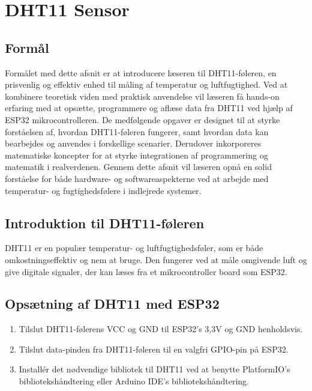 \section{DHT11 Sensor}
\subsection*{Formål}
Formålet med dette afsnit er at introducere læseren til DHT11-føleren, en prisvenlig og effektiv enhed til måling af temperatur og luftfugtighed. Ved at kombinere teoretisk viden med praktisk anvendelse vil læseren få hands-on erfaring med at opsætte, programmere og aflæse data fra DHT11 ved hjælp af ESP32 mikrocontrolleren. De medfølgende opgaver er designet til at styrke forståelsen af, hvordan DHT11-føleren fungerer, samt hvordan data kan bearbejdes og anvendes i forskellige scenarier. Derudover inkorporeres matematiske koncepter for at styrke integrationen af programmering og matematik i realverdenen. Gennem dette afsnit vil læseren opnå en solid forståelse for både hardware- og softwareaspekterne ved at arbejde med temperatur- og fugtighedsfølere i indlejrede systemer.

\subsection*{Introduktion til DHT11-føleren}
DHT11 er en populær temperatur- og luftfugtighedsføler, som er både omkostningseffektiv og nem at bruge. Den fungerer ved at måle omgivende luft og give digitale signaler, der kan læses fra et mikrocontroller board som ESP32.

\subsection*{Opsætning af DHT11 med ESP32}
\begin{enumerate}
	\item Tilslut DHT11-følerens VCC og GND til ESP32's 3,3V og GND henholdsvis.
	\item Tilslut data-pinden fra DHT11-føleren til en valgfri GPIO-pin på ESP32.
	\item Installér det nødvendige bibliotek til DHT11 ved at benytte PlatformIO's bibliotekshåndtering eller Arduino IDE's bibliotekshåndtering.
\end{enumerate}

